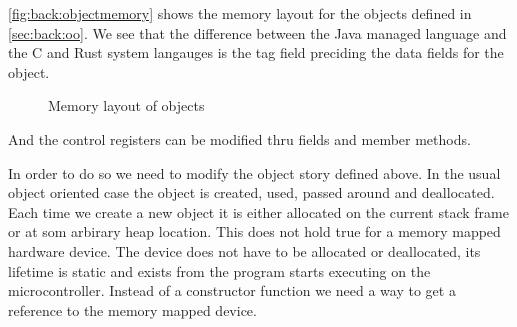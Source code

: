 \autoref{fig:back:objectmemory} shows the memory layout for the objects defined in \autoref{sec:back:oo}.
We see that the difference between the Java managed language and the C and Rust system langauges is the tag field preciding the data fields for the object.
\begin{figure}[H]

  \centering
  \hfill
  \hfill
  \caption{Memory layout of objects}
  \label{fig:back:memlayout}

\end{figure}

And the control registers can be modified thru fields and member methods.

In order to do so we need to modify the object story defined above.
In the usual object oriented case the object is created, used, passed around and deallocated.
Each time we create a new object it is either allocated on the current stack frame or at som arbirary heap location.
This does not hold true for a memory mapped hardware device.
The device does not have to be allocated or deallocated, its lifetime is static and exists from the program starts executing on the microcontroller.
Instead of a constructor function we need a way to get a reference to the memory mapped device.
